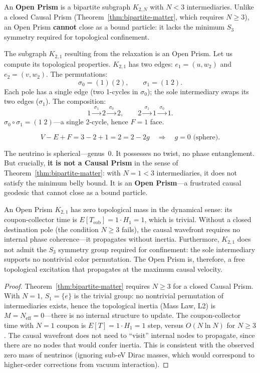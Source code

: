 \begin{definition}
\label{def:open-prism}
An \textbf{Open Prism} is a bipartite subgraph $K_{2,N}$ with
$N < 3$ intermediaries. Unlike a closed Causal Prism
(Theorem~\ref{thm:bipartite-matter}, which requires $N \geq 3$), an
Open Prism \textbf{cannot} close as a bound particle: it lacks the
minimum $S_3$ symmetry required for topological confinement.
\end{definition}

The subgraph $K_{2,1}$ resulting from the relaxation is an Open
Prism. Let us compute its topological properties. $K_{2,1}$ has
two edges: $e_1 = (u, w_2)$ and $e_2 = (v, w_2)$. The permutations:
\[
  \sigma_0 = (1)(2), \qquad \sigma_1 = (1\;2).
\]
Each pole has a single edge (two 1-cycles in $\sigma_0$); the sole
intermediary swaps its two edges ($\sigma_1$). The composition:
\[
  1 \xrightarrow{\;\sigma_1\;} 2 \xrightarrow{\;\sigma_0\;} 2,
  \qquad
  2 \xrightarrow{\;\sigma_1\;} 1 \xrightarrow{\;\sigma_0\;} 1.
\]
$\sigma_0 \circ \sigma_1 = (1\;2)$---a single 2-cycle, hence
$F = 1$ face.

\[
  V - E + F = 3 - 2 + 1 = 2 = 2 - 2g
  \quad\Longrightarrow\quad g = 0 \text{ (sphere).}
\]

The neutrino is spherical---genus~0. It possesses no twist, no
phase entanglement. But crucially, \textbf{it is not a
Causal Prism} in the sense of Theorem~\ref{thm:bipartite-matter}:
with $N = 1 < 3$ intermediaries, it does not satisfy the minimum
belly bound. It is an \textbf{Open Prism}---a frustrated causal
geodesic that cannot close as a bound particle.

\begin{theorem}
\label{thm:neutrino-massless}
An Open Prism $K_{2,1}$ has zero topological mass in the
dynamical sense: its coupon-collector time is $E[T_{\mathrm{cob}}]
= 1 \cdot H_1 = 1$, which is trivial. Without a closed
destination pole (the condition $N \geq 3$ fails), the causal
wavefront requires no internal phase coherence---it propagates
without inertia. Furthermore,
$K_{2,1}$ does not admit the $S_3$ symmetry group required for
confinement: the sole intermediary supports no
nontrivial color permutation. The Open Prism is, therefore,
a free topological excitation that propagates at the maximum
causal velocity.
\end{theorem}

\begin{proof}
Theorem~\ref{thm:bipartite-matter} requires $N \geq 3$ for a closed
Causal Prism. With $N = 1$, $S_1 = \{e\}$ is the trivial group:
no nontrivial permutation of intermediaries exists, hence
the topological inertia (Mass Law, L2) is $M = N_{\mathrm{eff}}
= 0$---there is no internal structure to update. The coupon-collector
time with $N = 1$ coupon is $E[T] = 1 \cdot
H_1 = 1$ step, versus $O(N \ln N)$ for $N \geq 3$. The causal
wavefront does not need to ``visit'' internal nodes to propagate,
since there are no nodes that would confer inertia. This is consistent with
the observed zero mass of neutrinos
(ignoring sub-eV Dirac masses, which would correspond to
higher-order corrections from vacuum interaction).
\end{proof}

